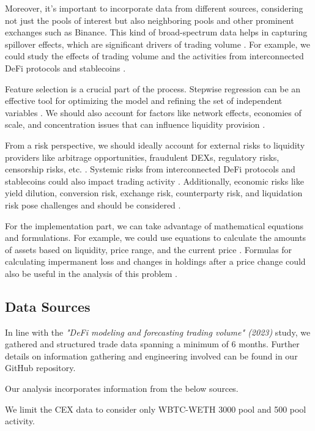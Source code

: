 \documentclass{article}
\begin{document}
Moreover, it's important to incorporate data from different sources, considering not just the pools of interest but also neighboring pools and other prominent exchanges such as Binance. This kind of broad-spectrum data helps in capturing spillover effects, which are significant drivers of trading volume \cite{Miori2023}. For example, we could study the effects of trading volume and the activities from interconnected DeFi protocols and stablecoins \cite{Miori2022}.

Feature selection is a crucial part of the process. Stepwise regression can be an effective tool for optimizing the model and refining the set of independent variables \cite{Miori2023}. We should also account for factors like network effects, economies of scale, and concentration issues that can influence liquidity provision \cite{Makarov2022, Miori2022}.

From a risk perspective, we should ideally account for external risks to liquidity providers like arbitrage opportunities, fraudulent DEXs, regulatory risks, censorship risks, etc. \cite{Aigner2021}. Systemic risks from interconnected DeFi protocols and stablecoins could also impact trading activity \cite{Makarov2022}. Additionally, economic risks like yield dilution, conversion risk, exchange risk, counterparty risk, and liquidation risk pose challenges and should be considered \cite{Xu2023}.

For the implementation part, we can take advantage of mathematical equations and formulations. For example, we could use equations to calculate the amounts of assets based on liquidity, price range, and the current price \cite{Elsts2021}. Formulas for calculating impermanent loss and changes in holdings after a price change could also be useful in the analysis of this problem \cite{Elsts2021, Aigner2021, Heimbach2022}.

\subsection{\textbf{Data Sources}}

In line with the \textit{"DeFi modeling and forecasting trading volume" (2023)} study\cite{Miori2023}, we gathered and structured trade data spanning a minimum of 6 months. Further details on information gathering and engineering involved can be found in our GitHub repository\cite{TeamRepo}. 

Our analysis incorporates information from the below sources.

We limit the CEX data to consider only WBTC-WETH 3000 pool and 500 pool activity.
\end{document}
